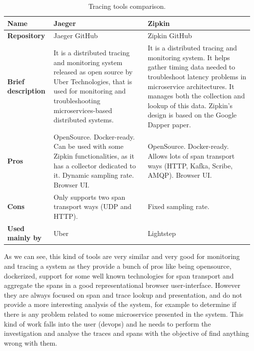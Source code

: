 \begin{table}[H]
\caption{Tracing tools comparison.}
\label{table:tracing_tools}
\centering
\large
\begin{tabularx}{\linewidth} {
    |>{\hsize=0.70\hsize}X| 
     >{\hsize=1.15\hsize}X|
     >{\hsize=1.15\hsize}X| }
     \hline
    \textbf{Name} 
    & Jaeger
    & Zipkin \\ \hline
    \textbf{Repository}
    & Jaeger GitHub \cite{jaeger_github}
    & Zipkin GitHub \cite{zipkin_github} \\ \hline
    \textbf{Brief description}
    & It is a distributed tracing and monitoring system released as open source by Uber Technologies, that is used for monitoring and troubleshooting microservices-based distributed systems.
    & It is a distributed tracing and monitoring system. It helps gather timing data needed to troubleshoot latency problems in microservice architectures. It manages both the collection and lookup of this data. Zipkin’s design is based on the Google Dapper paper. \\ \hline
    \textbf{Pros}
    & OpenSource. \newline
    Docker-ready. \newline
    Can be used with some Zipkin functionalities, as it has a collector dedicated to it. \newline
    Dynamic sampling rate. \newline
    Browser UI.
    & OpenSource. \newline
    Docker-ready. \newline
    Allows lots of span transport ways (HTTP, Kafka, Scribe, AMQP). \newline
    Browser UI. \\ \hline
    \textbf{Cons} 
    & Only supports two span transport ways (UDP and HTTP).
    & Fixed sampling rate. \\ \hline
    \textbf{Used mainly by}
    & Uber
    & Lightstep \\ \hline
\end{tabularx}
\end{table}

As we can see, this kind of tools are very similar and very good for monitoring and tracing a system as they provide a bunch of pros like being opensource, dockerized, support for some well known technologies for span transport and aggregate the spans in a good representational browser user-interface. However they are always focused on span and trace lookup and presentation, and do not provide a more interesting analysis of the system, for example to determine if there is any problem related to some microservice presented in the system. This kind of work falls into the user (\gls{devops}) and he needs to perform the investigation and analyse the traces and spans with the objective of find anything wrong with them.

